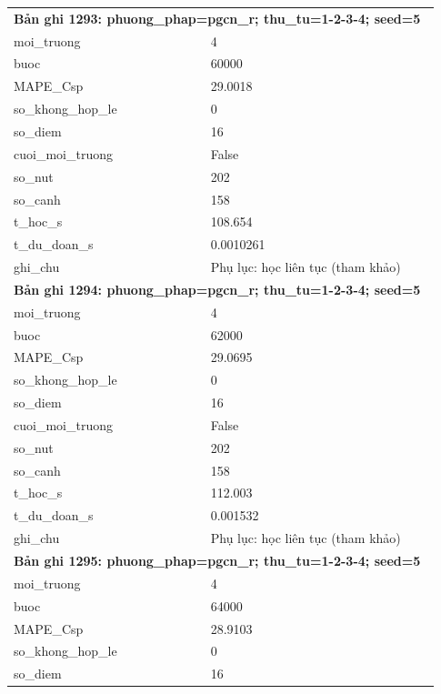 \begin{longtable}{p{0.43\linewidth}p{0.50\linewidth}}
\midrule
\multicolumn{2}{p{0.95\linewidth}}{\textbf{Bản ghi 1293: phuong\_phap=pgcn\_r; thu\_tu=1-2-3-4; seed=5}} \\
moi\_\allowbreak truong & 4 \\
buoc & 60000 \\
MAPE\_\allowbreak Csp & 29.0018 \\
so\_\allowbreak khong\_\allowbreak hop\_\allowbreak le & 0 \\
so\_\allowbreak diem & 16 \\
cuoi\_\allowbreak moi\_\allowbreak truong & False \\
so\_\allowbreak nut & 202 \\
so\_\allowbreak canh & 158 \\
t\_\allowbreak hoc\_\allowbreak s & 108.654 \\
t\_\allowbreak du\_\allowbreak doan\_\allowbreak s & 0.0010261 \\
ghi\_\allowbreak chu & Phụ lục: học liên tục (tham khảo) \\
\midrule
\multicolumn{2}{p{0.95\linewidth}}{\textbf{Bản ghi 1294: phuong\_phap=pgcn\_r; thu\_tu=1-2-3-4; seed=5}} \\
moi\_\allowbreak truong & 4 \\
buoc & 62000 \\
MAPE\_\allowbreak Csp & 29.0695 \\
so\_\allowbreak khong\_\allowbreak hop\_\allowbreak le & 0 \\
so\_\allowbreak diem & 16 \\
cuoi\_\allowbreak moi\_\allowbreak truong & False \\
so\_\allowbreak nut & 202 \\
so\_\allowbreak canh & 158 \\
t\_\allowbreak hoc\_\allowbreak s & 112.003 \\
t\_\allowbreak du\_\allowbreak doan\_\allowbreak s & 0.001532 \\
ghi\_\allowbreak chu & Phụ lục: học liên tục (tham khảo) \\
\midrule
\multicolumn{2}{p{0.95\linewidth}}{\textbf{Bản ghi 1295: phuong\_phap=pgcn\_r; thu\_tu=1-2-3-4; seed=5}} \\
moi\_\allowbreak truong & 4 \\
buoc & 64000 \\
MAPE\_\allowbreak Csp & 28.9103 \\
so\_\allowbreak khong\_\allowbreak hop\_\allowbreak le & 0 \\
so\_\allowbreak diem & 16 \\

\end{longtable}
